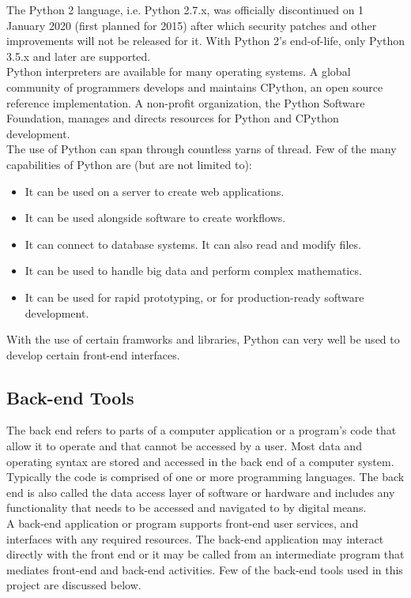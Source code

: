 \documentclass[14pt]{report}
\begin{document}
					The Python 2 language, i.e. Python 2.7.x, was officially discontinued on 1 January 2020 (first planned for 2015) after which security patches and other improvements will not be released for it. With Python 2's end-of-life, only Python 3.5.x and later are supported.\\

					Python interpreters are available for many operating systems. A global community of programmers develops and maintains CPython, an open source reference implementation. A non-profit organization, the Python Software Foundation, manages and directs resources for Python and CPython development.\\

					The use of Python can span through countless yarns of thread. Few of the many capabilities of Python are (but are not limited to):
					\begin{itemize}
						\item It can be used on a server to create web applications.
						\item It can be used alongside software to create workflows.
						\item It can connect to database systems. It can also read and modify files.
						\item It can be used to handle big data and perform complex mathematics.
						\item It can be used for rapid prototyping, or for production-ready software development.
					\end{itemize}

					With the use of certain framworks and libraries, Python can very well be used to develop certain front-end interfaces.
			\subsection{Back-end Tools}
		
				The back end refers to parts of a computer application or a program's code that allow it to operate and that cannot be accessed by a user. Most data and operating syntax are stored and accessed in the back end of a computer system. Typically the code is comprised of one or more programming languages. The back end is also called the data access layer of software or hardware and includes any functionality that needs to be accessed and navigated to by digital means.\\

				A back-end application or program supports front-end user services, and interfaces with any required resources. The back-end application may interact directly with the front end or it may be called from an intermediate program that mediates front-end and back-end activities. Few of the back-end tools used in this project are discussed below.
\end{document}
